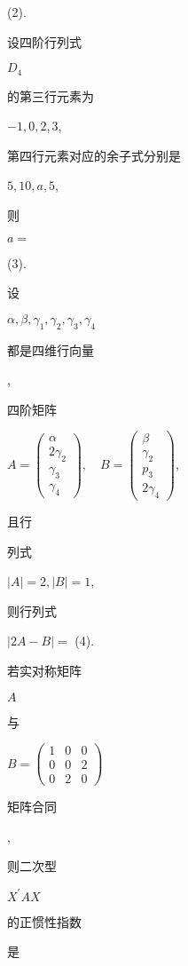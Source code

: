 \documentclass[10pt]{article}
\begin{document}
(2). \begin{CJK}{UTF8}{mj}设四阶行列式\end{CJK} $D_{4}$ \begin{CJK}{UTF8}{mj}的第三行元素为\end{CJK} $-1,0,2,3$, \begin{CJK}{UTF8}{mj}第四行元素对应的余子式分别是\end{CJK} $5,10, a, 5$, \begin{CJK}{UTF8}{mj}则\end{CJK} $a=$

(3). \begin{CJK}{UTF8}{mj}设\end{CJK} $\alpha, \beta, \gamma_{1}, \gamma_{2}, \gamma_{3}, \gamma_{4}$ \begin{CJK}{UTF8}{mj}都是四维行向量\end{CJK}, \begin{CJK}{UTF8}{mj}四阶矩阵\end{CJK} $A=\left(\begin{array}{c}\alpha \\ 2 \gamma_{2} \\ \gamma_{3} \\ \gamma_{4}\end{array}\right), \quad B=\left(\begin{array}{c}\beta \\ \gamma_{2} \\ p_{3} \\ 2 \gamma_{4}\end{array}\right)$, \begin{CJK}{UTF8}{mj}且行\end{CJK} \begin{CJK}{UTF8}{mj}列式\end{CJK} $|A|=2,|B|=1$, \begin{CJK}{UTF8}{mj}则行列式\end{CJK} $|2 A-B|=$ (4). \begin{CJK}{UTF8}{mj}若实对称矩阵\end{CJK} $A$ \begin{CJK}{UTF8}{mj}与\end{CJK} $B=\left(\begin{array}{lll}1 & 0 & 0 \\ 0 & 0 & 2 \\ 0 & 2 & 0\end{array}\right)$ \begin{CJK}{UTF8}{mj}矩阵合同\end{CJK}, \begin{CJK}{UTF8}{mj}则二次型\end{CJK} $X^{\prime} A X$ \begin{CJK}{UTF8}{mj}的正惯性指数\end{CJK} \begin{CJK}{UTF8}{mj}是\end{CJK}
\end{document}
